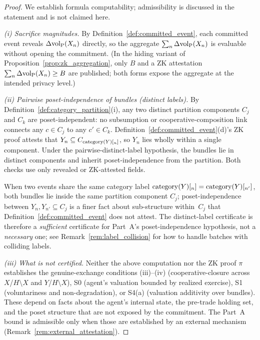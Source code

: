 \begin{proof}
We establish formula computability; admissibility is discussed
in the statement and is not claimed here.

\emph{(i) Sacrifice magnitudes.}
By Definition~\ref{def:committed_event}, each committed event
reveals $\Delta{\operatorname{vol}_{\mathrm{P}}}(X_n)$ directly, so the aggregate
$\sum_n \Delta{\operatorname{vol}_{\mathrm{P}}}(X_n)$ is evaluable without opening the
commitment.  (In the hiding variant of
Proposition~\ref{prop:zk_aggregation}, only $B$ and a ZK
attestation $\sum_n \Delta{\operatorname{vol}_{\mathrm{P}}}(X_n) \geq B$ are published;
both forms expose the aggregate at the intended privacy level.)

\emph{(ii) Pairwise poset-independence of bundles (distinct
labels).}
By Definition~\ref{def:category_partition}(i), any two distinct
partition components $C_j$ and $C_k$ are poset-independent: no
subsumption or cooperative-composition link connects any
$c \in C_j$ to any $c' \in C_k$.
Definition~\ref{def:committed_event}(d)'s ZK proof attests that
$Y_n \subseteq C_{\mathrm{category}(Y)[_n]}$, so $Y_n$ lies wholly within a
single component.  Under the pairwise-distinct-label
hypothesis, the bundles lie in distinct components and inherit
poset-independence from the partition.  Both checks use only
revealed or ZK-attested fields.

When two events share the same category label
$\mathrm{category}(Y)[_{n}] = \mathrm{category}(Y)[_{n'}]$, both bundles lie inside the same
partition component $C_j$; poset-independence between
$Y_n, Y_{n'} \subseteq C_j$ is a finer fact about sub-structure
within~$C_j$ that Definition~\ref{def:committed_event} does not
attest.  The distinct-label certificate is therefore a
\emph{sufficient} certificate for Part~A's
poset-independence hypothesis, not a \emph{necessary} one; see
Remark~\ref{rem:label_collision} for how to handle batches with
colliding labels.

\emph{(iii) What is not certified.}
Neither the above computation nor the ZK proof $\pi$ establishes
the genuine-exchange conditions (iii)--(iv)
(cooperative-closure across $X$/$H \setminus X$ and
$Y$/$H \setminus X$), S0 (agent's valuation bounded by realized
exercise), S1 (voluntariness and non-degradation), or S4(a)
(valuation additivity over bundles).  These depend on facts
about the agent's internal state, the pre-trade holding set,
and the poset structure that are not exposed by the commitment.
The Part~A bound is admissible only when those are established
by an external mechanism (Remark~\ref{rem:external_attestation}).
\end{proof}


